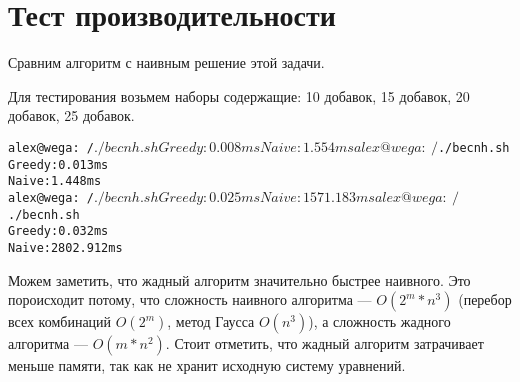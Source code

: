 \section{Тест производительности}
Сравним алгоритм с наивным решение этой задачи.

Для тестирования возьмем наборы содержащие: 10 добавок, 15 добавок, 20 добавок, 25 добавок.

\begin{alltt}
alex@wega:~/$ ./becnh.sh 
Greedy: 0.008 ms
Naive: 1.554 ms
alex@wega:~/$ ./becnh.sh 
Greedy: 0.013 ms
Naive: 1.448 ms
alex@wega:~/$ ./becnh.sh 
Greedy: 0.025 ms
Naive: 1571.183 ms
alex@wega:~/$ ./becnh.sh 
Greedy: 0.032 ms
Naive: 2802.912 ms
\end{alltt}

Можем заметить, что жадный алгоритм значительно быстрее наивного. Это пороисходит потому, что сложность наивного алгоритма ---
$O(2^m*n^3)$ (перебор всех комбинаций $O(2^m)$, метод Гаусса $O(n^3)$), а сложность жадного алгоритма --- $O(m*n^2)$. 
Стоит отметить, что жадный алгоритм затрачивает меньше памяти, так как не хранит исходную систему уравнений.

\pagebreak
